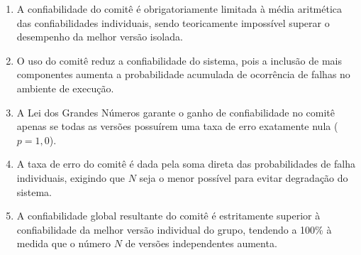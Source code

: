 \documentclass[12pt,a4paper]{article}
\begin{document}
\begin{enumerate}[label=\textbf{(\Alph*)}]
    
    \item A confiabilidade do comitê é obrigatoriamente limitada à média aritmética das confiabilidades individuais, sendo teoricamente impossível superar o desempenho da melhor versão isolada.
    \item O uso do comitê reduz a confiabilidade do sistema, pois a inclusão de mais componentes aumenta a probabilidade acumulada de ocorrência de falhas no ambiente de execução.
    \item A Lei dos Grandes Números garante o ganho de confiabilidade no comitê apenas se todas as versões possuírem uma taxa de erro exatamente nula ($p = 1,0$).
    \item A taxa de erro do comitê é dada pela soma direta das probabilidades de falha individuais, exigindo que $N$ seja o menor possível para evitar degradação do sistema.
    \item A confiabilidade global resultante do comitê é estritamente superior à confiabilidade da melhor versão individual do grupo, tendendo a 100\% à medida que o número $N$ de versões independentes aumenta.
\end{enumerate}
\end{document}
